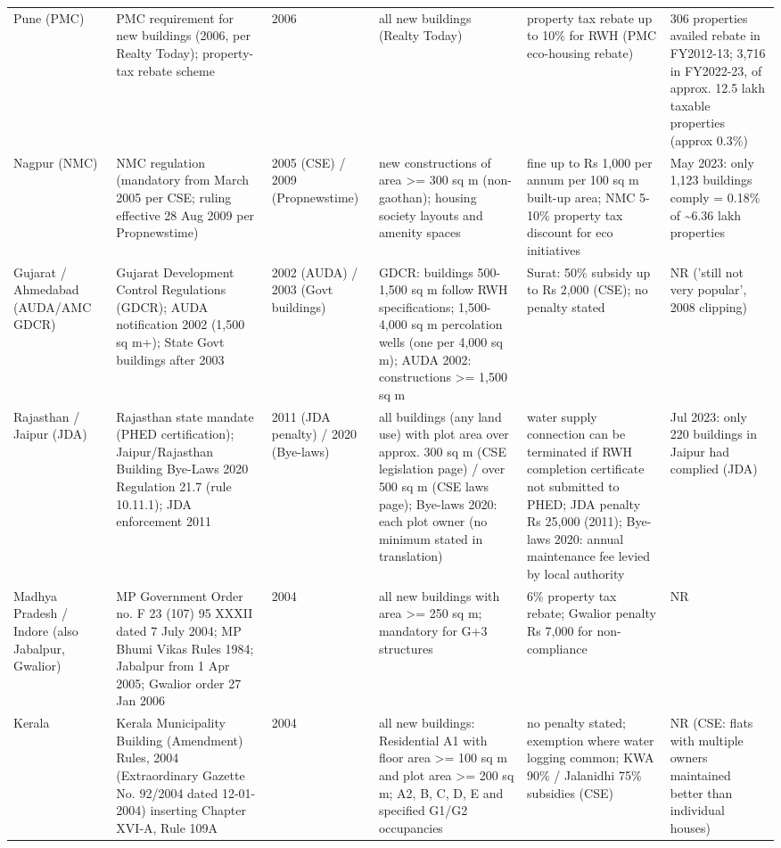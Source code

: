 {\begin{longtable}{p{2.1cm} p{3cm} p{1.3cm} p{3cm} p{2.9cm} p{3.4cm}}
Pune (PMC) & PMC requirement for new buildings (2006, per Realty Today); property-tax rebate scheme & 2006 & all new buildings (Realty Today) & property tax rebate up to 10\% for RWH (PMC eco-housing rebate) & 306 properties availed rebate in FY2012-13; 3,716 in FY2022-23, of approx. 12.5 lakh taxable properties (approx 0.3\%)\\
Nagpur (NMC) & NMC regulation (mandatory from March 2005 per CSE; ruling effective 28 Aug 2009 per Propnewstime) & 2005 (CSE) / 2009 (Propnewstime) & new constructions of area >= 300 sq m (non-gaothan); housing society layouts and amenity spaces & fine up to Rs 1,000 per annum per 100 sq m built-up area; NMC 5-10\% property tax discount for eco initiatives & May 2023: only 1,123 buildings comply = 0.18\% of \textasciitilde 6.36 lakh properties\\
Gujarat / Ahmedabad (AUDA/AMC GDCR) & Gujarat Development Control Regulations (GDCR); AUDA notification 2002 (1,500 sq m+); State Govt buildings after 2003 & 2002 (AUDA) / 2003 (Govt buildings) & GDCR: buildings 500-1,500 sq m follow RWH specifications; 1,500-4,000 sq m percolation wells (one per 4,000 sq m); AUDA 2002: constructions >= 1,500 sq m & Surat: 50\% subsidy up to Rs 2,000 (CSE); no penalty stated & NR ('still not very popular', 2008 clipping)\\
Rajasthan / Jaipur (JDA) & Rajasthan state mandate (PHED certification); Jaipur/Rajasthan Building Bye-Laws 2020 Regulation 21.7 (rule 10.11.1); JDA enforcement 2011 & 2011 (JDA penalty) / 2020 (Bye-laws) & all buildings (any land use) with plot area over approx. 300 sq m (CSE legislation page) / over 500 sq m (CSE laws page); Bye-laws 2020: each plot owner (no minimum stated in translation) & water supply connection can be terminated if RWH completion certificate not submitted to PHED; JDA penalty Rs 25,000 (2011); Bye-laws 2020: annual maintenance fee levied by local authority & Jul 2023: only 220 buildings in Jaipur had complied (JDA)\\
Madhya Pradesh / Indore (also Jabalpur, Gwalior) & MP Government Order no. F 23 (107) 95 XXXII dated 7 July 2004; MP Bhumi Vikas Rules 1984; Jabalpur from 1 Apr 2005; Gwalior order 27 Jan 2006 & 2004 & all new buildings with area >= 250 sq m; mandatory for G+3 structures & 6\% property tax rebate; Gwalior penalty Rs 7,000 for non-compliance & NR\\
Kerala & Kerala Municipality Building (Amendment) Rules, 2004 (Extraordinary Gazette No. 92/2004 dated 12-01-2004) inserting Chapter XVI-A, Rule 109A & 2004 & all new buildings: Residential A1 with floor area >= 100 sq m and plot area >= 200 sq m; A2, B, C, D, E and specified G1/G2 occupancies & no penalty stated; exemption where water logging common; KWA 90\% / Jalanidhi 75\% subsidies (CSE) & NR (CSE: flats with multiple owners maintained better than individual houses)\\

\end{longtable}}
